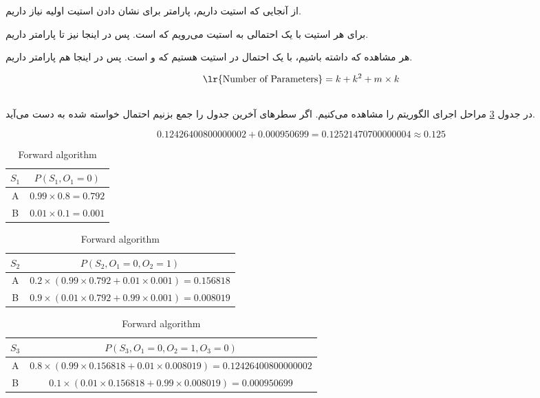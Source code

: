 \documentclass{university}
\begin{document}
\setupdocument

\section{}
از آنجایی که 
استیت داریم، 
پارامتر برای نشان دادن استیت اولیه نیاز داریم. 

برای هر استیت 
با یک احتمالی به استیت 
می‌رویم که 
است. پس در اینجا نیز 
تا 
پارامتر داریم. 

هر مشاهده 
که داشته باشیم، با یک احتمال در استیت 
هستیم که 
و
است. 
پس در اینجا هم 
پارامتر داریم. 

$$
\text{\lr{Number of Parameters}} = k + k^2 + m \times k
$$

\subsection{}

در جدول 
\ref{tab:forward}
مراحل اجرای الگوریتم را مشاهده می‌کنیم. اگر سطرهای آخرین جدول را جمع بزنیم احتمال خواسته شده به دست می‌آید.

$$
0.12426400800000002 + 0.000950699 = 0.12521470700000004 \approx 0.125
$$

\begin{latin}
\begin{table}
    \centering
    \begin{tabular}{|c|c|}
        \hline 
        $S_1$ & $P(S_1, O_1 = 0)$ \\
        \hline 
        A & $0.99 \times 0.8 = 0.792$ \\
        B & $0.01 \times 0.1 = 0.001$ \\
        \hline 
    \end{tabular}
    \centering
    \begin{tabular}{|c|c|}
        \hline 
        $S_2$ & $P(S_2, O_1 = 0, O_2 = 1)$ \\
        \hline 
        A & $0.2 \times (0.99 \times 0.792 + 0.01 \times 0.001) = 0.156818$ \\
        B & $0.9 \times (0.01 \times 0.792 + 0.99 \times 0.001) = 0.008019$ \\
        \hline 
    \end{tabular}
    \centering
    \begin{tabular}{|c|c|}
        \hline 
        $S_3$ & $P(S_3, O_1 = 0, O_2 = 1, O_3 = 0)$ \\
        \hline 
        A & $0.8 \times (0.99 \times 0.156818 + 0.01 \times 0.008019) = 0.12426400800000002$ \\
        B & $0.1 \times (0.01 \times 0.156818 + 0.99 \times 0.008019) = 0.000950699$ \\
        \hline 
    \end{tabular}
    \caption{Forward algorithm}
    \label{tab:forward}
\end{table}
\end{latin}
\end{document}
